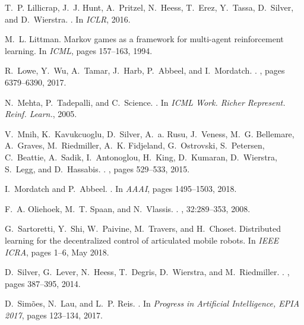 \documentclass{article}
\begin{document}
\begin{thebibliography}{10}
	T.~P. Lillicrap, J.~J. Hunt, A.~Pritzel, N.~Heess, T.~Erez, Y.~Tassa,
	D.~Silver, and D.~Wierstra.
	.
	\newblock In {\em ICLR}, 2016.
	
	M.~L. Littman.
	\newblock Markov games as a framework for multi-agent reinforcement learning.
	\newblock In {\em ICML}, pages 157--163, 1994.
	
	R.~Lowe, Y.~Wu, A.~Tamar, J.~Harb, P.~Abbeel, and I.~Mordatch.
	.
	, pages 6379--6390, 2017.
	
	N.~Mehta, P.~Tadepalli, and C.~Science.
	.
	\newblock In {\em ICML Work. Richer Represent. Reinf. Learn.}, 2005.
	
	V.~Mnih, K.~Kavukcuoglu, D.~Silver, A.~a. Rusu, J.~Veness, M.~G. Bellemare,
	A.~Graves, M.~Riedmiller, A.~K. Fidjeland, G.~Ostrovski, S.~Petersen,
	C.~Beattie, A.~Sadik, I.~Antonoglou, H.~King, D.~Kumaran, D.~Wierstra,
	S.~Legg, and D.~Hassabis.
	.
	, pages 529--533, 2015.
	
	I.~Mordatch and P.~Abbeel.
	.
	\newblock In {\em AAAI}, pages 1495--1503, 2018.
	
	F.~A. Oliehoek, M.~T. Spaan, and N.~Vlassis.
	.
	, 32:289--353, 2008.
	
	G.~{Sartoretti}, Y.~{Shi}, W.~{Paivine}, M.~{Travers}, and H.~{Choset}.
	\newblock Distributed learning for the decentralized control of articulated
	mobile robots.
	\newblock In {\em IEEE ICRA}, pages 1--6, May 2018.
	
	D.~Silver, G.~Lever, N.~Heess, T.~Degris, D.~Wierstra, and M.~Riedmiller.
	.
	, pages 387--395, 2014.
	
	D.~Sim{\~{o}}es, N.~Lau, and L.~P. Reis.
	.
	\newblock In {\em Progress in Artificial Intelligence, EPIA 2017}, pages
	123--134, 2017.
	

\end{thebibliography}
\end{document}
